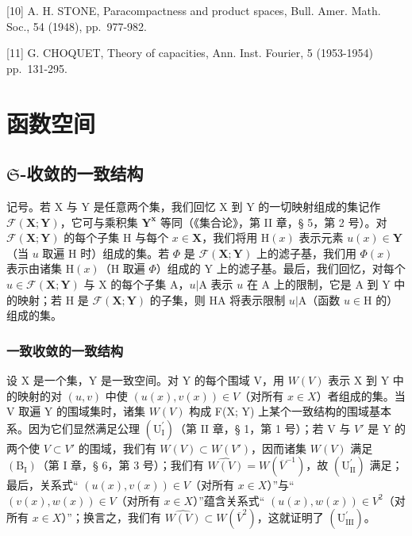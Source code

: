 {[}10{]} A. H. STONE, Paracompactness and product spaces, Bull. Amer. Math. Soc., 54 (1948), pp.~977-982.

{[}11{]} G. CHOQUET, Theory of capacities, Ann. Inst. Fourier, 5 (1953-1954) pp.~131-295.

\ResumeMainChapters
\chapter{函数空间}

\section{\texorpdfstring{\(\mathfrak{S}\)-收敛的一致结构}{S-收敛的一致结构}}

记号。若 X 与 Y 是任意两个集，我们回忆 X 到 Y 的一切映射组成的集记作 \(\mathcal{F}(\mathbf{X};\mathbf{Y})\)，它可与乘积集 \(\mathbf{Y}^{\mathbf{x}}\) 等同（《集合论》，第 II 章，§ 5，第 2 号）。对 \(\mathcal{F}(\mathbf{X};\mathbf{Y})\) 的每个子集 H 与每个 \(x\in \mathbf{X}\)，我们将用 \(\mathrm{H}(x)\) 表示元素 \(u(x)\in \mathbf{Y}\)（当 \(u\) 取遍 H 时）组成的集。若 \(\Phi\) 是 \(\mathcal{F}(\mathbf{X};\mathbf{Y})\) 上的滤子基，我们用 \(\Phi (x)\) 表示由诸集 \(\mathrm{H}(x)\)（H 取遍 \(\Phi\)）组成的 Y 上的滤子基。最后，我们回忆，对每个 \(u\in \mathcal{F}(\mathbf{X};\mathbf{Y})\) 与 X 的每个子集 A，\(u|\mathrm{A}\) 表示 \(u\) 在 A 上的限制，它是 A 到 Y 中的映射；若 H 是 \(\mathcal{F}(\mathbf{X};\mathbf{Y})\) 的子集，则 H\textbar A 将表示限制 \(u|\mathrm{A}\)（函数 \(u\in \mathrm{H}\) 的）组成的集。

\subsection{一致收敛的一致结构}

设 X 是一个集，Y 是一致空间。对 Y 的每个围域 V，用 \(W(V)\) 表示 X 到 Y 中的映射的对 \((u, v)\) 中使 \((u(x), v(x)) \in V\)（对所有 \(x \in X\)）者组成的集。当 V 取遍 Y 的围域集时，诸集 \(W(V)\) 构成 F(X; Y) 上某个一致结构的围域基本系。因为它们显然满足公理 \((\mathrm{U}_{\mathrm{I}}^{\prime})\)（第 II 章，§ 1，第 1 号）；若 V 与 \(V'\) 是 Y 的两个使 \(V \subset V'\) 的围域，我们有 \(W(V) \subset W(V')\)，因而诸集 \(W(V)\) 满足 \((\mathrm{B}_{\mathrm{I}})\)（第 I 章，§ 6，第 3 号）；我们有 \(\widehat{W(V)} = W(\overline{V}^{-1})\)，故 \((\mathrm{U}_{\mathrm{II}}^{\prime})\) 满足；最后，关系式`` \((u(x), v(x)) \in V\)（对所有 \(x \in X\)）''与`` \((v(x), w(x)) \in V\)（对所有 \(x \in X\)）''蕴含关系式`` \((u(x), w(x)) \in V^{2}\)（对所有 \(x \in X\)）''；换言之，我们有 \(\widehat{W(V)} \subset W(\overline{V}^{2})\)，这就证明了 \((\mathrm{U}_{\mathrm{III}}^{\prime})\)。

